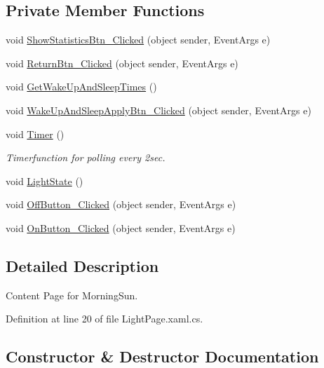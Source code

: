 \subsection*{Private Member Functions}
\begin{DoxyCompactItemize}
\item 
void \mbox{\hyperlink{class_f_w_p_s___app_1_1_light_page_abccdee54e45269de159d5f4cbe64c5f0}{Show\+Statistics\+Btn\+\_\+\+Clicked}} (object sender, Event\+Args e)
\item 
void \mbox{\hyperlink{class_f_w_p_s___app_1_1_light_page_a175b88d56e180cb789369cbfd8b19049}{Return\+Btn\+\_\+\+Clicked}} (object sender, Event\+Args e)
\item 
void \mbox{\hyperlink{class_f_w_p_s___app_1_1_light_page_a37f6598ccd0bc239cf848fca9385a083}{Get\+Wake\+Up\+And\+Sleep\+Times}} ()
\item 
void \mbox{\hyperlink{class_f_w_p_s___app_1_1_light_page_a05d841154f05b112f5cb7b5d32603f76}{Wake\+Up\+And\+Sleep\+Apply\+Btn\+\_\+\+Clicked}} (object sender, Event\+Args e)
\item 
void \mbox{\hyperlink{class_f_w_p_s___app_1_1_light_page_a43b09976b1c9789c5e421145974e202c}{Timer}} ()
\begin{DoxyCompactList}\small\item\em Timerfunction for polling every 2sec. \end{DoxyCompactList}\item 
void \mbox{\hyperlink{class_f_w_p_s___app_1_1_light_page_ada307c2038d1eda07106e8eaed3604e9}{Light\+State}} ()
\item 
void \mbox{\hyperlink{class_f_w_p_s___app_1_1_light_page_a9be94c8345ecaeae99d5edc9c085c456}{Off\+Button\+\_\+\+Clicked}} (object sender, Event\+Args e)
\item 
void \mbox{\hyperlink{class_f_w_p_s___app_1_1_light_page_a516f001270814260dc23efb76923c866}{On\+Button\+\_\+\+Clicked}} (object sender, Event\+Args e)
\end{DoxyCompactItemize}


\subsection{Detailed Description}
Content Page for Morning\+Sun. 

Definition at line 20 of file Light\+Page.\+xaml.\+cs.



\subsection{Constructor \& Destructor Documentation}
\mbox{\label{class_f_w_p_s___app_1_1_light_page_aa1c460a8fc9fc56ef888ea677b255ee9}} 
